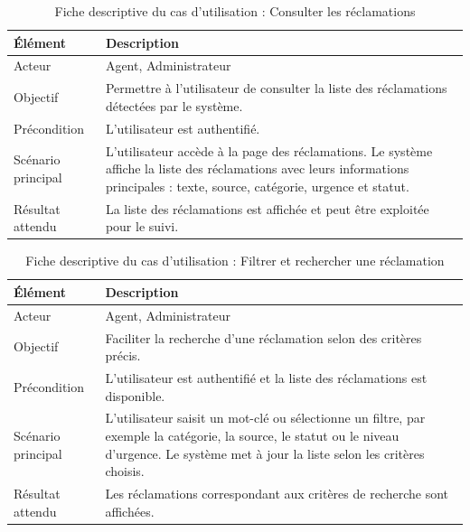 \documentclass[12pt,a4paper,oneside]{report}
\begin{document}
\begin{table}[H]
\centering
\small
\caption{Fiche descriptive du cas d’utilisation : Consulter les réclamations}
\begin{tabular}{|p{4cm}|p{9cm}|}
\hline
\textbf{Élément} & \textbf{Description} \\
\hline
Acteur & Agent, Administrateur \\
\hline
Objectif & Permettre à l’utilisateur de consulter la liste des réclamations détectées par le système. \\
\hline
Précondition & L’utilisateur est authentifié. \\
\hline
Scénario principal & L’utilisateur accède à la page des réclamations. Le système affiche la liste des réclamations avec leurs informations principales : texte, source, catégorie, urgence et statut. \\
\hline
Résultat attendu & La liste des réclamations est affichée et peut être exploitée pour le suivi. \\
\hline
\end{tabular}
\end{table}

\begin{table}[H]
\centering
\small
\caption{Fiche descriptive du cas d’utilisation : Filtrer et rechercher une réclamation}
\begin{tabular}{|p{4cm}|p{9cm}|}
\hline
\textbf{Élément} & \textbf{Description} \\
\hline
Acteur & Agent, Administrateur \\
\hline
Objectif & Faciliter la recherche d’une réclamation selon des critères précis. \\
\hline
Précondition & L’utilisateur est authentifié et la liste des réclamations est disponible. \\
\hline
Scénario principal & L’utilisateur saisit un mot-clé ou sélectionne un filtre, par exemple la catégorie, la source, le statut ou le niveau d’urgence. Le système met à jour la liste selon les critères choisis. \\
\hline
Résultat attendu & Les réclamations correspondant aux critères de recherche sont affichées. \\
\hline
\end{tabular}
\end{table}
\end{document}
